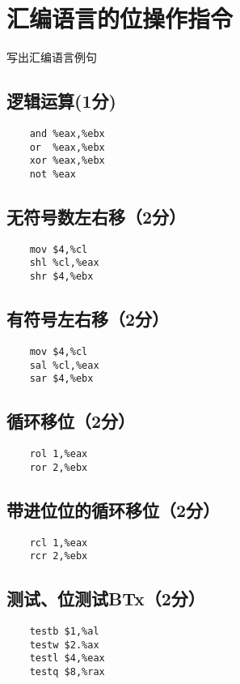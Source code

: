 \section{汇编语言的位操作指令}
\begin{center}
    写出汇编语言例句
\end{center}

\subsection{逻辑运算(1分)}
\begin{verbatim}
    and %eax,%ebx
    or  %eax,%ebx
    xor %eax,%ebx
    not %eax
\end{verbatim}

\subsection{无符号数左右移（2分）}
\begin{verbatim}
    mov $4,%cl
    shl %cl,%eax
    shr $4,%ebx
\end{verbatim}

\subsection{有符号左右移（2分）}
\begin{verbatim}
    mov $4,%cl
    sal %cl,%eax
    sar $4,%ebx
\end{verbatim}

\subsection{循环移位（2分）}
\begin{verbatim}
    rol 1,%eax
    ror 2,%ebx
\end{verbatim}

\subsection{带进位位的循环移位（2分）}
\begin{verbatim}
    rcl 1,%eax
    rcr 2,%ebx
\end{verbatim}

\subsection{测试、位测试BTx（2分）}
\begin{verbatim}
    testb $1,%al
    testw $2.%ax
    testl $4,%eax
    testq $8,%rax
\end{verbatim}

